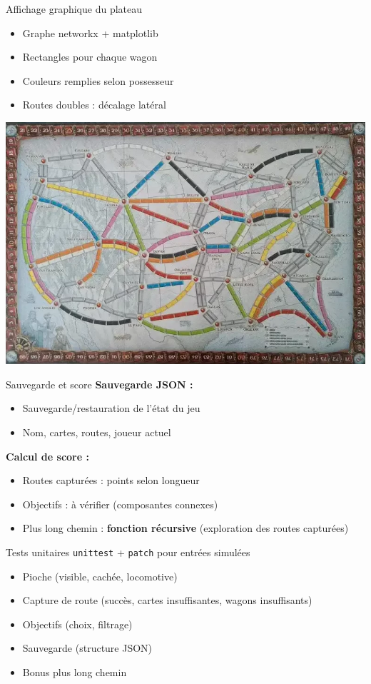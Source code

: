 \documentclass{beamer}
\begin{document}
\begin{frame}{Affichage graphique du plateau}
\begin{itemize}
    \item Graphe networkx + matplotlib
    \item Rectangles pour chaque wagon
    \item Couleurs remplies selon possesseur
    \item Routes doubles : d\'ecalage lat\'eral
\end{itemize}
\includegraphics[width=0.8\linewidth]{plateau.png}
\end{frame}

\begin{frame}{Sauvegarde et score}
\textbf{Sauvegarde JSON :}
\begin{itemize}
    \item Sauvegarde/restauration de l'\'etat du jeu
    \item Nom, cartes, routes, joueur actuel
\end{itemize}
\textbf{Calcul de score :}
\begin{itemize}
    \item Routes captur\'ees : points selon longueur
    \item Objectifs : \`a v\'erifier (composantes connexes)
    \item Plus long chemin : \textbf{fonction r\'ecursive} (exploration des routes captur\'ees)
\end{itemize}
\end{frame}

\begin{frame}{Tests unitaires}
\texttt{unittest} + \texttt{patch} pour entr\'ees simul\'ees
\begin{itemize}
    \item Pioche (visible, cach\'ee, locomotive)
    \item Capture de route (succ\`es, cartes insuffisantes, wagons insuffisants)
    \item Objectifs (choix, filtrage)
    \item Sauvegarde (structure JSON)
    \item Bonus plus long chemin
\end{itemize}
\end{frame}
\end{document}
